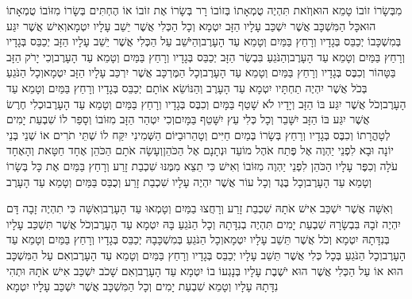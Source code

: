\documentclass[../main/main.tex]{subfiles}
\begin{document}
\begin{multicols*}{\ncols}
מִבְּשָׂרוֹ זוֹבוֹ טָמֵא הוּא\PreVerseSpace{}וְזֹאת תִּהְיֶה טֻמְאָתוֹ בְּזוֹבוֹ רָר בְּשָׂרוֹ אֶת זוֹבוֹ אוֹ הֶחְתִּים בְּשָׂרוֹ מִזּוֹבוֹ טֻמְאָתוֹ הוּא\PreVerseSpace{}כָּל הַמִּשְׁכָּב אֲשֶׁר יִשְׁכַּב עָלָיו הַזָּב יִטְמָא וְכָל הַכְּלִי אֲשֶׁר יֵשֵׁב עָלָיו יִטְמָא\PreVerseSpace{}וְאִישׁ אֲשֶׁר יִגַּע בְּמִשְׁכָּבוֹ יְכַבֵּס בְּגָדָיו וְרָחַץ בַּמַּיִם וְטָמֵא עַד הָעָרֶב\PreVerseSpace{}וְהַיֹּשֵׁב עַל הַכְּלִי אֲשֶׁר יֵשֵׁב עָלָיו הַזָּב יְכַבֵּס בְּגָדָיו וְרָחַץ בַּמַּיִם וְטָמֵא עַד הָעָרֶב\PreVerseSpace{}וְהַנֹּגֵעַ בִּבְשַׂר הַזָּב יְכַבֵּס בְּגָדָיו וְרָחַץ בַּמַּיִם וְטָמֵא עַד הָעָרֶב\PreVerseSpace{}וְכִי יָרֹק הַזָּב בַּטָּהוֹר וְכִבֶּס בְּגָדָיו וְרָחַץ בַּמַּיִם וְטָמֵא עַד הָעָרֶב\PreVerseSpace{}וְכָל הַמֶּרְכָּב אֲשֶׁר יִרְכַּב עָלָיו הַזָּב יִטְמָא\PreVerseSpace{}וְכָל הַנֹּגֵעַ בְּכֹל אֲשֶׁר יִהְיֶה תַחְתָּיו יִטְמָא עַד הָעָרֶב וְהַנּוֹשֵׂא אוֹתָם יְכַבֵּס בְּגָדָיו וְרָחַץ בַּמַּיִם וְטָמֵא עַד הָעָרֶב\PreVerseSpace{}וְכֹל אֲשֶׁר יִגַּע בּוֹ הַזָּב וְיָדָיו לֹא שָׁטַף בַּמָּיִם וְכִבֶּס בְּגָדָיו וְרָחַץ בַּמַּיִם וְטָמֵא עַד הָעָרֶב\PreVerseSpace{}וּכְלִי חֶרֶשׂ אֲשֶׁר יִגַּע בּוֹ הַזָּב יִשָּׁבֵר וְכָל כְּלִי עֵץ יִשָּׁטֵף בַּמָּיִם\PreVerseSpace{}וְכִי יִטְהַר הַזָּב מִזּוֹבוֹ וְסָפַר לוֹ שִׁבְעַת יָמִים לְטָהֳרָתוֹ וְכִבֶּס בְּגָדָיו וְרָחַץ בְּשָׂרוֹ בְּמַיִם חַיִּים וְטָהֵר\PreVerseSpace{}וּבַיּוֹם הַשְּׁמִינִי יִקַּח לוֹ שְׁתֵּי תֹרִים אוֹ שְׁנֵי בְּנֵי יוֹנָה וּבָא לִפְנֵי יַהְוֶה אֶל פֶּתַח אֹהֶל מוֹעֵד וּנְתָנָם אֶל הַכֹּהֵן\PreVerseSpace{}וְעָשָׂה אֹתָם הַכֹּהֵן אֶחָד חַטָּאת וְהָאֶחָד עֹלָה וְכִפֶּר עָלָיו הַכֹּהֵן לִפְנֵי יַהְוֶה מִזּוֹבוֹ \ClosedSection{}וְאִישׁ כִּי תֵצֵא מִמֶּנּוּ שִׁכְבַת זָרַע וְרָחַץ בַּמַּיִם אֶת כָּל בְּשָׂרוֹ וְטָמֵא עַד הָעָרֶב\PreVerseSpace{}וְכָל בֶּגֶד וְכָל עוֹר אֲשֶׁר יִהְיֶה עָלָיו שִׁכְבַת זָרַע וְכֻבַּס בַּמַּיִם וְטָמֵא עַד הָעָרֶב\OpenSection{}\par
{}וְאִשָּׁה אֲשֶׁר יִשְׁכַּב אִישׁ אֹתָהּ שִׁכְבַת זָרַע וְרָחֲצוּ בַמַּיִם וְטָמְאוּ עַד הָעָרֶב\PreVerseSpace{}וְאִשָּׁה כִּי תִהְיֶה זָבָה דָּם יִהְיֶה זֹבָהּ בִּבְשָׂרָהּ שִׁבְעַת יָמִים תִּהְיֶה בְנִדָּתָהּ וְכָל הַנֹּגֵעַ בָּהּ יִטְמָא עַד הָעָרֶב\PreVerseSpace{}וְכֹל אֲשֶׁר תִּשְׁכַּב עָלָיו בְּנִדָּתָהּ יִטְמָא וְכֹל אֲשֶׁר תֵּשֵׁב עָלָיו יִטְמָא\PreVerseSpace{}וְכָל הַנֹּגֵעַ בְּמִשְׁכָּבָהּ יְכַבֵּס בְּגָדָיו וְרָחַץ בַּמַּיִם וְטָמֵא עַד הָעָרֶב\PreVerseSpace{}וְכָל הַנֹּגֵעַ בְּכָל כְּלִי אֲשֶׁר תֵּשֵׁב עָלָיו יְכַבֵּס בְּגָדָיו וְרָחַץ בַּמַּיִם וְטָמֵא עַד הָעָרֶב\PreVerseSpace{}וְאִם עַל הַמִּשְׁכָּב הוּא אוֹ עַל הַכְּלִי אֲשֶׁר הוּא יֹשֶׁבֶת עָלָיו בְּנָגְעוֹ בוֹ יִטְמָא עַד הָעָרֶב\PreVerseSpace{}וְאִם שָׁכֹב יִשְׁכַּב אִישׁ אֹתָהּ וּתְהִי נִדָּתָהּ עָלָיו וְטָמֵא שִׁבְעַת יָמִים וְכָל הַמִּשְׁכָּב אֲשֶׁר יִשְׁכַּב עָלָיו יִטְמָא\OpenSection{}\par

\end{multicols*}
\end{document}

